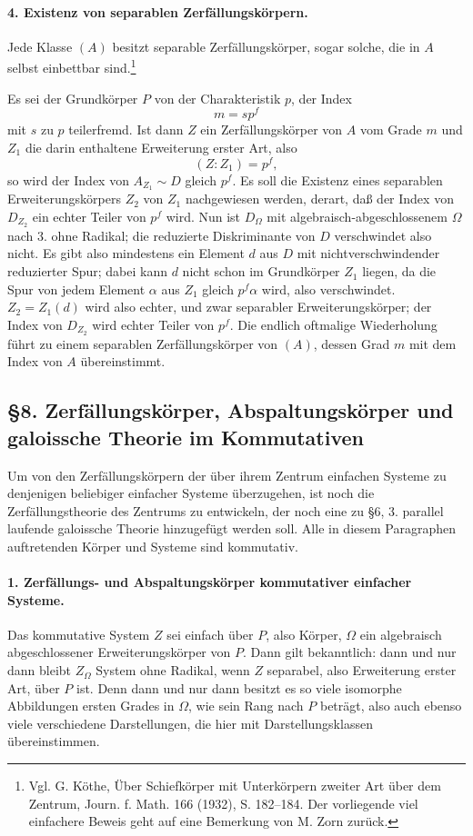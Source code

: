 \documentclass[11pt]{article}
\begin{document}
\paragraph{4. Existenz von separablen Zerfällungskörpern.}
Jede Klasse \((A)\) besitzt separable Zerfällungskörper, sogar solche, die in \(A\) selbst einbettbar sind.\footnote{Vgl. G. Köthe, Über Schiefkörper mit Unterkörpern zweiter Art über dem Zentrum, Journ. f. Math. 166 (1932), S. 182--184. Der vorliegende viel einfachere Beweis geht auf eine Bemerkung von M. Zorn zurück.}

Es sei der Grundkörper \(P\) von der Charakteristik \(p\), der Index
\[
        m=s p^f
\]
mit \(s\) zu \(p\) teilerfremd. Ist dann \(Z\) ein Zerfällungskörper von \(A\) vom Grade \(m\) und \(Z_1\) die darin enthaltene Erweiterung erster Art, also
\[
        (Z:Z_1)=p^f,
\]
so wird der Index von \(A_{Z_1}\sim D\) gleich \(p^f\). Es soll die Existenz eines separablen Erweiterungskörpers \(Z_2\) von \(Z_1\) nachgewiesen werden, derart, daß der Index von \(D_{Z_2}\) ein echter Teiler von \(p^f\) wird. Nun ist \(D_\Omega\) mit algebraisch-abgeschlossenem \(\Omega\) nach 3. ohne Radikal; die reduzierte Diskriminante von \(D\) verschwindet also nicht. Es gibt also mindestens ein Element \(d\) aus \(D\) mit nichtverschwindender reduzierter Spur; dabei kann \(d\) nicht schon im Grundkörper \(Z_1\) liegen, da die Spur von jedem Element \(\alpha\) aus \(Z_1\) gleich \(p^f\alpha\) wird, also verschwindet. \(Z_2=Z_1(d)\) wird also echter, und zwar separabler Erweiterungskörper; der Index von \(D_{Z_2}\) wird echter Teiler von \(p^f\). Die endlich oftmalige Wiederholung führt zu einem separablen Zerfällungskörper von \((A)\), dessen Grad \(m\) mit dem Index von \(A\) übereinstimmt.

\subsection*{§8. Zerfällungskörper, Abspaltungskörper und galoissche Theorie im Kommutativen}

Um von den Zerfällungskörpern der über ihrem Zentrum einfachen Systeme zu denjenigen beliebiger einfacher Systeme überzugehen, ist noch die Zerfällungstheorie des Zentrums zu entwickeln, der noch eine zu §6, 3. parallel laufende galoissche Theorie hinzugefügt werden soll. Alle in diesem Paragraphen auftretenden Körper und Systeme sind kommutativ.

\paragraph{1. Zerfällungs- und Abspaltungskörper kommutativer einfacher Systeme.}
Das kommutative System \(Z\) sei einfach über \(P\), also Körper, \(\Omega\) ein algebraisch abgeschlossener Erweiterungskörper von \(P\). Dann gilt bekanntlich: dann und nur dann bleibt \(Z_\Omega\) System ohne Radikal, wenn \(Z\) separabel, also Erweiterung erster Art, über \(P\) ist. Denn dann und nur dann besitzt es so viele isomorphe Abbildungen ersten Grades in \(\Omega\), wie sein Rang nach \(P\) beträgt, also auch ebenso viele verschiedene Darstellungen, die hier mit Darstellungsklassen übereinstimmen.
\end{document}
